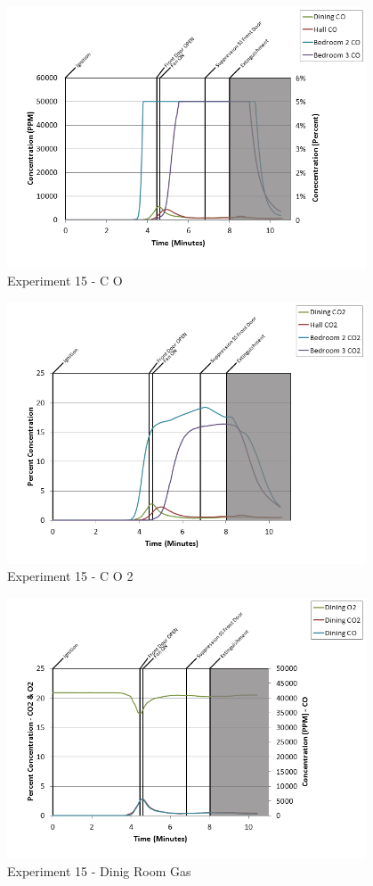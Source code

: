 \documentclass{article}
\begin{document}
\begin{appendices}
\clearpage

\begin{figure}[h!]
	\centering
	\includegraphics[height=3.05in]{0_Images/Results_Charts/Exp_15_Charts/CO.png}
	\caption{Experiment 15 - C O}
\end{figure}


\begin{figure}[h!]
	\centering
	\includegraphics[height=3.05in]{0_Images/Results_Charts/Exp_15_Charts/CO2.png}
	\caption{Experiment 15 - C O 2}
\end{figure}

\clearpage

\begin{figure}[h!]
	\centering
	\includegraphics[height=3.05in]{0_Images/Results_Charts/Exp_15_Charts/DinigRoomGas.png}
	\caption{Experiment 15 - Dinig Room Gas}
\end{figure}



\end{appendices}
\end{document}

